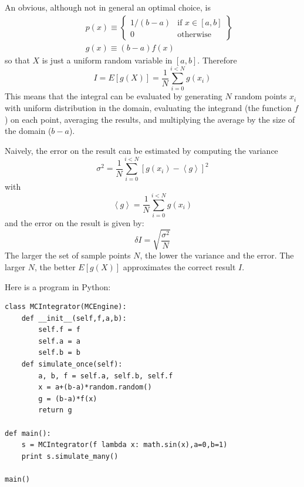 \documentclass[justified,sixbynine]{tufte-book}
\def\ft{\small\tt}
\theoremstyle{plain}%
\theoremstyle{definition}
\theoremstyle{remark}
\begin{document}
\begin{fullwidth}
An obvious, although not in general an optimal choice, is
\begin{eqnarray}
&&p(x)\equiv \left\{
\begin{array}{ll}
1/(b-a) & \text{if }x\in [a,b] \\
0 & \text{otherwise}
\end{array}
\right\}   \label{defchoice} \\
&&g(x)\equiv (b-a)f(x)  \nonumber
\end{eqnarray}
so that $X$ is just a uniform random variable in $[a,b]$. Therefore
\begin{equation}
I=E\left[ g(X)\right] =\frac1N \sum_{i=0}^{i<N}g(x_i)
\end{equation}
This means that the integral can be evaluated by generating $N$ random
points $x_i$ with uniform distribution in the domain, evaluating the
integrand (the function $f$) on each point, averaging the results, and
multiplying the average by the size of the domain ($b-a$).

Naively, the error on the result can be estimated by computing the variance
\begin{equation}
\sigma ^2 = \frac 1N\sum_{i=0}^{i<N}\left[ g(x_i)-\left\langle
g\right\rangle \right] ^2
\end{equation}
with
\begin{equation}
\left\langle g\right\rangle = \frac 1N\sum_{i=0}^{i<N}g(x_i)
\end{equation}
and the error on the result is given by:
\begin{equation}
\delta I=\sqrt{\frac{\sigma ^2}{N}}
\end{equation}
The larger the set of sample points $N$, the lower the variance and the
error. The larger $N$, the better $E[g(X)]$ approximates the correct result $%
I$.


Here is a program in Python:

\begin{lstlisting}[caption={in file: {\ft integrate.py}}]
class MCIntegrator(MCEngine):
    def __init__(self,f,a,b):
        self.f = f
        self.a = a
        self.b = b
    def simulate_once(self):
        a, b, f = self.a, self.b, self.f
        x = a+(b-a)*random.random()
        g = (b-a)*f(x)
        return g

def main():
    s = MCIntegrator(f lambda x: math.sin(x),a=0,b=1)
    print s.simulate_many()

main()
\end{lstlisting}


\end{fullwidth}
\end{document}
